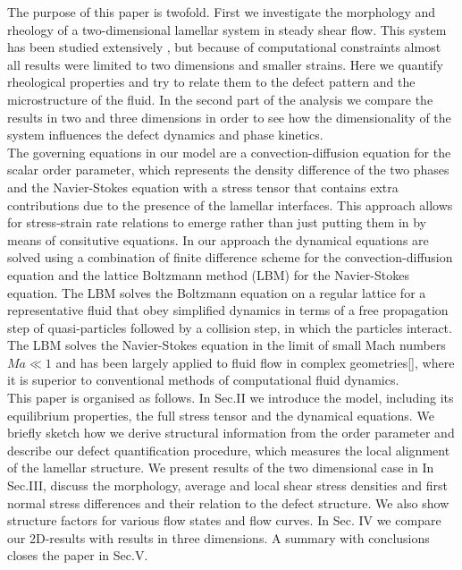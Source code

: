 \documentclass[8.5pt,twoside,twocolumn]{article}
\begin{document}
The purpose of this paper is twofold.
First we investigate the morphology and rheology of a two-dimensional lamellar system in steady shear flow.
This system has been studied extensively \cite{Swift96,Gonnella97,Gonnella98,Xu03,Xu05,Xu06a,Xu06b}, but because of computational constraints almost all results were limited to two dimensions and smaller strains.
Here we quantify rheological properties and try to relate them to the defect pattern and the microstructure of the fluid.
In the second part of the analysis we compare the results in two and three dimensions in order to see how the dimensionality of the system influences the defect dynamics and phase kinetics.
\\ 
The governing equations in our model are a convection-diffusion equation for the scalar order parameter, which represents the density difference of the two phases and the Navier-Stokes equation with a stress tensor that contains extra contributions due to the presence of the lamellar interfaces.
This approach allows for stress-strain rate relations to emerge rather than just putting them in by means of consitutive equations.
In our approach the dynamical equations are solved using a combination of finite difference scheme for the convection-diffusion equation and the lattice Boltzmann method (LBM) \cite{Succi} for the Navier-Stokes equation.
The LBM solves the Boltzmann equation on a regular lattice for a representative fluid that obey simplified dynamics in terms of a free propagation step of quasi-particles followed by a collision step, in which the particles interact.
The LBM solves the Navier-Stokes equation in the limit of small Mach numbers $Ma\ll1$ and has been largely applied to fluid flow in complex geometries[], where it is superior to conventional methods of computational fluid dynamics.\\ 
This paper is organised as follows. In Sec.II we introduce the model, including its equilibrium properties, the full stress tensor and the dynamical equations.
We briefly sketch how we derive structural information from the order parameter and describe our defect quantification procedure, which measures the local alignment of the lamellar structure.
We present results of the two dimensional case in In Sec.III, discuss the morphology, average and local shear stress densities and first normal stress differences and their relation to the defect structure.
We also show structure factors for various flow states and flow curves.
In Sec. IV we compare our 2D-results with results in three dimensions. 
A summary with conclusions closes the paper in Sec.V.
\end{document}
